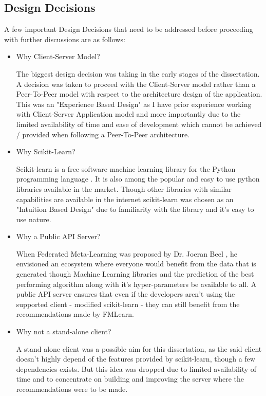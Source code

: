 \subsection{Design Decisions}
\label{design-decisioins}
A few important Design Decisions that need to be addressed before proceeding with further discussions are as follows:
\begin{itemize}
    \item Why Client-Server Model?
    
    The biggest design decision was taking in the early stages of the dissertation. A decision was taken to proceed with the Client-Server model rather than a Peer-To-Peer model with respect to the architecture design of the application. This was an "Experience Based Design" as I have prior experience working with Client-Server Application model and more importantly due to the limited availability of time and ease of development which cannot be achieved / provided when following a Peer-To-Peer architecture.

    \item Why Scikit-Learn?
    
    Scikit-learn is a free software machine learning library for the Python programming language \citep{scikit-learn}. It is also among the popular and easy to use python libraries available in the market. Though other libraries with similar capabilities are available in the internet scikit-learn was chosen as an "Intuition Based Design" due to familiarity with the library and it's easy to use nature.
    
    \item Why a Public API Server?
    
    When Federated Meta-Learning was proposed by Dr. Joeran Beel \citep{fml}, he envisioned an ecosystem where everyone would benefit from the data that is generated though Machine Learning libraries and the prediction of the best performing algorithm along with it's hyper-parameters be available to all. A public API server ensures that even if the developers aren't using the supported client - modified scikit-learn - they can still benefit from the recommendations made by FMLearn.
    
    \item Why not a stand-alone client?
    
    A stand alone client was a possible aim for this dissertation, as the said client doesn't highly depend of the features provided by scikit-learn, though a few dependencies exists. But this idea was dropped due to limited availability of time and to concentrate on building and improving the server where the recommendations were to be made.
    

\end{itemize}
